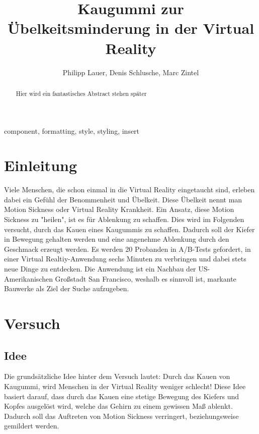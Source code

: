 \documentclass[conference]{IEEEtran}
\begin{document}
\title{Kaugummi zur Übelkeitsminderung in der Virtual Reality\\}

\author{Philipp Lauer, Denis Schlusche, Marc Zintel}

\maketitle

\begin{abstract}
Hier wird ein fantastisches Abstract stehen später
\end{abstract}

\begin{IEEEkeywords}
component, formatting, style, styling, insert
\end{IEEEkeywords}

\section{Einleitung}
Viele Menschen, die schon einmal in die Virtual Reality eingetaucht sind, erleben dabei ein Gefühl der Benommenheit und Übelkeit. Diese Übelkeit nennt man Motion Sickness oder Virtual Reality Krankheit. Ein Ansatz, diese Motion Sickness zu "heilen", ist es für Ablenkung zu schaffen. Dies wird im Folgenden versucht, durch das Kauen eines Kaugummis zu schaffen. Dadurch soll der Kiefer in Bewegung gehalten werden und eine angenehme Ablenkung durch den Geschmack erzeugt werden. Es werden 20 Probanden in A/B-Tests gefordert, in einer Virtual Realtiy-Anwendung sechs Minuten zu verbringen und dabei stets neue Dinge zu entdecken. Die Anwendung ist ein Nachbau der US-Amerikanischen Großstadt San Francisco, weshalb es sinnvoll ist, markante Bauwerke als Ziel der Suche aufzugeben. 

\section{Versuch}
\subsection{Idee}
Die grundsätzliche Idee hinter dem Versuch lautet: Durch das Kauen von Kaugummi, wird Menschen in der Virtual Reality weniger schlecht!
Diese Idee basiert darauf, dass durch das Kauen eine stetige Bewegung des Kiefers und Kopfes ausgelöst wird, welche das Gehirn zu einem gewissen Maß ablenkt. Dadurch soll das Auftreten von Motion Sickness verringert, beziehungsweise gemildert werden. 
\end{document}
